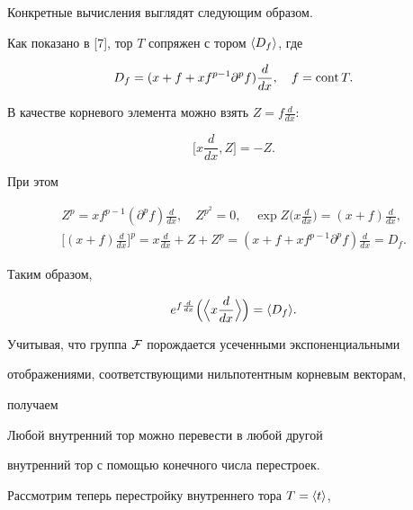  


Конкретные вычисления выглядят следующим образом. 


Как показано в [7], тор $T$ сопряжен с тором $\langle D_f\rangle$, где 


$$ 


D_f=(x+f+x f^{p-1}\partial^p f)\frac{d}{dx}, 


\quad f=\cont T. 


$$ 


В качестве корневого элемента можно взять $Z=f\frac{d}{dx}$: 


$$ 


\Big[x\frac{d}{dx},Z\Big]=-Z. 


$$ 


При этом 


\begin{gather*} 


Z^p=x f^{p-1}(\partial^p f)\frac{d}{dx},\quad 


Z^{p^2}=0,\quad \exp Z\Big(x\frac{d}{dx}\Big)= 


(x+f)\frac{d}{dx},\\ 


\Big[(x+f)\frac{d}{dx}\Big]^p=x\frac{d}{dx}+Z+Z^p= 


(x+f+x f^{p-1}\partial^p f)\frac{d}{dx}=D_f. 


\end{gather*} 


Таким образом, 


$$ 


e^{f\frac{d}{dx}}\Big(\Big\la x\frac{d}{dx}\Big\ra\Big)= 


\la D_f\ra. 


$$ 


Учитывая, что группа $\cal F$ порождается усеченными экспоненциальными 


отображениями, соответствующими нильпотентным корневым векторам, 


получаем 


 


\begin{cor} Любой внутренний тор можно перевести в любой другой 


внутренний тор с помощью конечного числа перестроек. 


\end{cor} 


 


Рассмотрим теперь перестройку внутреннего тора $T=\langle t\rangle$, 


